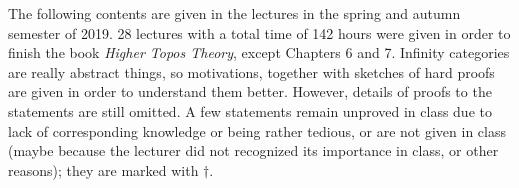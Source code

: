 The following contents are given in the lectures in the spring and autumn semester of 2019. 28 lectures with a total time of 142 hours 
were given in order to finish the book \textit{Higher Topos Theory}, except Chapters 6 and 7. Infinity categories are
really abstract things, so motivations, together with sketches of hard proofs are given in order to understand them better. 
However, details of proofs to the statements are still omitted. A few statements 
remain unproved in class due to lack of corresponding knowledge or being rather tedious, or are not given in class
(maybe because the lecturer did not recognized its importance in class, or other reasons); they are marked with $\dagger$.